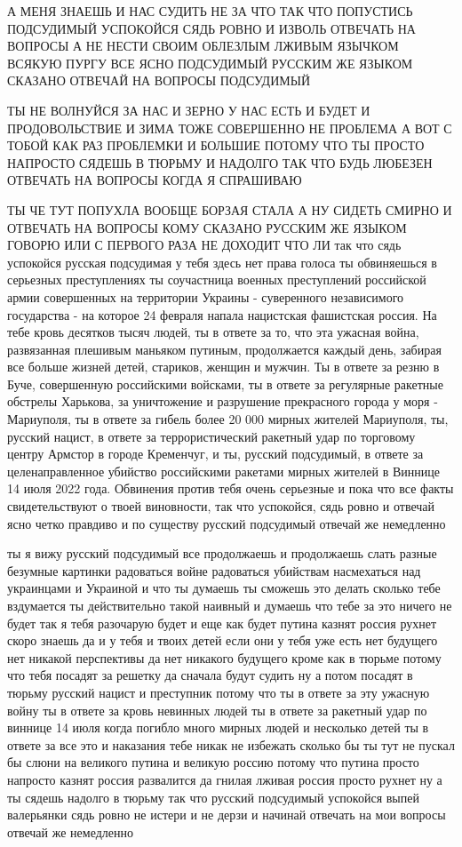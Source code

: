 А МЕНЯ ЗНАЕШЬ И НАС СУДИТЬ НЕ ЗА ЧТО ТАК ЧТО ПОПУСТИСЬ ПОДСУДИМЫЙ УСПОКОЙСЯ
СЯДЬ РОВНО И ИЗВОЛЬ ОТВЕЧАТЬ НА ВОПРОСЫ А НЕ НЕСТИ СВОИМ ОБЛЕЗЛЫМ ЛЖИВЫМ
ЯЗЫЧКОМ ВСЯКУЮ ПУРГУ ВСЕ ЯСНО ПОДСУДИМЫЙ РУССКИМ ЖЕ ЯЗЫКОМ СКАЗАНО ОТВЕЧАЙ НА
ВОПРОСЫ ПОДСУДИМЫЙ

ТЫ НЕ ВОЛНУЙСЯ ЗА НАС И ЗЕРНО У НАС ЕСТЬ И БУДЕТ И ПРОДОВОЛЬСТВИЕ И ЗИМА ТОЖЕ
СОВЕРШЕННО НЕ ПРОБЛЕМА А ВОТ С ТОБОЙ КАК РАЗ ПРОБЛЕМКИ И БОЛЬШИЕ ПОТОМУ ЧТО ТЫ
ПРОСТО НАПРОСТО СЯДЕШЬ В ТЮРЬМУ И НАДОЛГО ТАК ЧТО БУДЬ ЛЮБЕЗЕН ОТВЕЧАТЬ НА
ВОПРОСЫ КОГДА Я СПРАШИВАЮ

ТЫ ЧЕ ТУТ ПОПУХЛА ВООБЩЕ БОРЗАЯ СТАЛА А НУ СИДЕТЬ СМИРНО И ОТВЕЧАТЬ НА ВОПРОСЫ
КОМУ СКАЗАНО РУССКИМ ЖЕ ЯЗЫКОМ ГОВОРЮ ИЛИ С ПЕРВОГО РАЗА НЕ ДОХОДИТ ЧТО ЛИ
так что сядь успокойся русская подсудимая у тебя здесь нет права голоса
ты обвиняешься в серьезных преступлениях ты соучастница военных преступлений 
российской армии совершенных на территории Украины - суверенного независимого государства -
на которое 24 февраля напала нацистская фашистская россия. На тебе кровь десятков тысяч людей,
ты в ответе за то, что эта ужасная война, развязанная плешивым маньяком путиным,
продолжается каждый день, забирая все больше жизней детей, стариков, женщин и мужчин.
Ты в ответе за резню в Буче, совершенную российскими войсками, ты в ответе за
регулярные ракетные обстрелы Харькова, за уничтожение и разрушение прекрасного города у моря - 
Мариуполя, ты в ответе за гибель более 20 000 мирных жителей Мариуполя, ты, русский нацист, в ответе
за террористический ракетный удар по торговому центру Армстор в городе Кременчуг, и ты, русский подсудимый, в ответе
за целенаправленное убийство российскими ракетами мирных жителей в Виннице 14 июля 2022 года. Обвинения против тебя
очень серьезные и пока что все факты свидетельствуют о твоей виновности, так что успокойся, сядь
ровно и отвечай ясно четко правдиво и по существу русский подсудимый отвечай же немедленно

ты я вижу русский подсудимый все продолжаешь и продолжаешь слать разные
безумные картинки радоваться войне радоваться убийствам насмехаться над
украинцами и Украиной и что ты думаешь ты сможешь это делать сколько тебе
вздумается ты действительно такой наивный и думаешь что тебе за это ничего не
будет так я тебя разочарую будет и еще как будет путина казнят россия рухнет
скоро знаешь да и у тебя и твоих детей если они у тебя уже есть нет будущего
нет никакой перспективы да нет никакого будущего кроме как в тюрьме потому что
тебя посадят за решетку да сначала будут судить ну а потом посадят в тюрьму
русский нацист и преступник потому что ты в ответе за эту ужасную войну ты в
ответе за кровь невинных людей ты в ответе за ракетный удар по виннице 14 июля
когда погибло много мирных людей и несколько детей ты в ответе за все это и
наказания тебе никак не избежать сколько бы ты тут не пускал бы слюни на
великого путина и великую россию потому что путина просто напросто казнят
россия развалится да гнилая лживая россия просто рухнет ну а ты сядешь надолго
в тюрьму так что русский подсудимый успокойся выпей валерьянки сядь ровно не
истери и не дерзи и начинай отвечать на мои вопросы отвечай же немедленно

